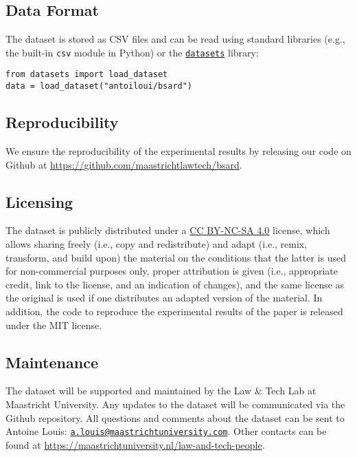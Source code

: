 \documentclass[11pt]{article}
\begin{document}
\subsection{Data Format}
The dataset is stored as CSV files and can be read using standard libraries (e.g., the built-in \texttt{csv} module in Python) or the \href{https://pypi.org/project/datasets/}{\hf \texttt{datasets}} library:
\begin{lstlisting}[style=CEE]
from datasets import load_dataset
data = load_dataset("antoiloui/bsard")
\end{lstlisting}

\subsection{Reproducibility}
We ensure the reproducibility of the experimental results by releasing our code on Github at {\footnotesize \url{https://github.com/maastrichtlawtech/bsard}}.

\subsection{Licensing}
The dataset is publicly distributed under a \href{https://creativecommons.org/licenses/by-nc-sa/4.0/}{CC BY-NC-SA 4.0} license, which allows sharing freely (i.e., copy and redistribute) and adapt (i.e., remix, transform, and build upon) the material on the conditions that the latter is used for non-commercial purposes only, proper attribution is given (i.e., appropriate credit, link to the license, and an indication of changes), and the same license as the original is used if one distributes an adapted version of the material. In addition, the code to reproduce the experimental results of the paper is released under the MIT license.

\subsection{Maintenance}
The dataset will be supported and maintained by the Law \& Tech Lab at Maastricht University. Any updates to the dataset will be communicated via the Github repository. All questions and comments about the dataset can be sent to Antoine Louis: \href{mailto:}{\footnotesize \texttt{a.louis@maastrichtuniversity.com}}. Other contacts can be found at {\footnotesize \url{https://maastrichtuniversity.nl/law-and-tech-people}}.
\end{document}
